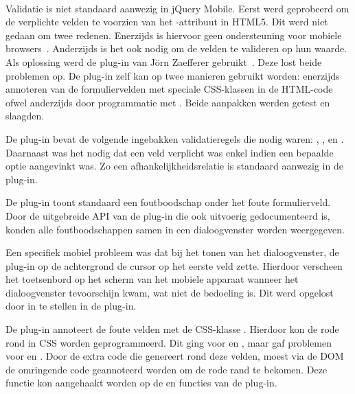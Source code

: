 \paragraph{\jqm}
Validatie is niet standaard aanwezig in jQuery Mobile. 
Eerst werd geprobeerd om de verplichte velden te voorzien van het -attribuut in HTML5. 
Dit werd niet gedaan om twee redenen.
Enerzijds is hiervoor geen ondersteuning voor mobiele browsers~\cite{Deveria2013}. 
Anderzijds is het ook nodig om de velden te valideren op hun waarde.
Als oplossing werd de plug-in van Jörn Zaefferer gebruikt~\cite{Zaefferer2013}. 
Deze lost beide problemen op.
De plug-in zelf kan op twee manieren gebruikt worden: enerzijds annoteren van de formuliervelden met speciale CSS-klassen in de HTML-code ofwel anderzijds door programmatie met \js{}. 
Beide aanpakken werden getest en slaagden. 

De plug-in bevat de volgende ingebakken validatieregels die nodig waren: , ,  en .
Daarnaast was het nodig dat een veld verplicht was enkel indien een bepaalde optie aangevinkt was.
Zo een afhankelijkheidsrelatie is standaard aanwezig in de plug-in.

De plug-in toont standaard een foutboodschap onder het foute formulierveld.
Door de uitgebreide API van de plug-in die ook uitvoerig gedocumenteerd is, konden alle foutboodschappen samen in een dialoogvenster worden weergegeven.

Een specifiek mobiel probleem was dat bij het tonen van het dialoogvenster, de plug-in op de achtergrond de cursor op het eerste veld zette. 
Hierdoor verscheen het toetsenbord op het scherm van het mobiele apparaat wanneer het dialoogvenster tevoorschijn kwam, wat niet de bedoeling is. 
Dit werd opgelost door  in te stellen in de plug-in.

De plug-in annoteert de foute velden met de CSS-klasse .
Hierdoor kon de rode rond in CSS worden geprogrammeerd. 
Dit ging voor  en , maar gaf problemen voor  en .
Door de extra code die \jqm{} genereert rond deze velden, moest via de DOM de omringende code geannoteerd worden om de rode rand te bekomen. 
Deze functie kon aangehaakt worden op de  en  functies van de plug-in.

